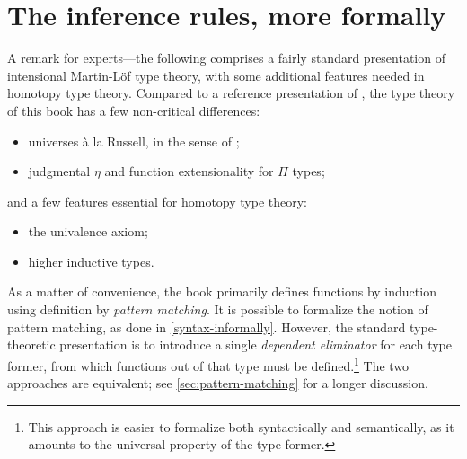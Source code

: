 \egroup

\section{The inference rules, more formally}\label{syntax-more-formally}

\bgroup %

\newcommand{\Gm}{\Gamma}      %
\newcommand{\ctx}{\ensuremath{\mathsf{ctx}}}
\newcommand{\emptyctx}{\cdot}
\newcommand{\wfctx}[1]{\vdash #1\ \ctx}
\newcommand{\oftp}[3]{#1 \vdash #2 : #3}
\newcommand{\jdeqtp}[4]{#1 \vdash #2 \jdeq #3 : #4}
\newcommand{\judg}[2]{#1 \vdash #2}
\newcommand{\tmtp}[2]{#1 \mathord{:} #2}
\newcommand{\form}{\textsc{form}}
\newcommand{\intro}{\textsc{intro}}
\newcommand{\elim}{\textsc{elim}}
\newcommand{\comp}{\textsc{comp}}
\newcommand{\Weak}{\mathsf{Wkg}}
\newcommand{\Vble}{\mathsf{Vble}}
\newcommand{\Exch}{\mathsf{Exch}}
\newcommand{\Subst}{\mathsf{Subst}}

\let\syn\mathsf

A remark for experts---the following comprises a fairly standard presentation of
intensional Martin-L\"{o}f type theory, with some additional features needed in
homotopy type theory. Compared to a reference presentation of
\cite{hofmann:syntax-and-semantics}, the type theory of this book has a few
non-critical differences:
\begin{itemize}
\item universes \`{a} la Russell, in the sense of
\cite{martin-lof:bibliopolis};
\item judgmental $\eta$ and function extensionality for $\Pi$ types;
\end{itemize}
and a few features essential for homotopy type theory:
\begin{itemize}
\item the univalence axiom;
\item higher inductive types.
\end{itemize}

As a matter of convenience, the book primarily defines functions by induction
using definition by \emph{pattern matching}. It is possible to formalize the
notion of pattern matching, as done in \autoref{syntax-informally}. However, the
standard type-theoretic presentation is to introduce a single \emph{dependent
eliminator} for each type former, from which functions out of that type must be
defined.\footnote{This approach is easier to formalize both syntactically and
semantically, as it amounts to the universal property of the type former.}
The two approaches are equivalent; see \autoref{sec:pattern-matching} for a
longer discussion.

